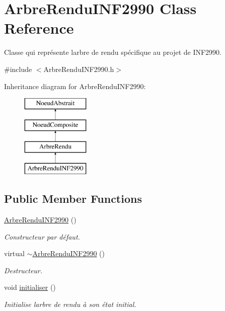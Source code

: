 \hypertarget{class_arbre_rendu_i_n_f2990}{}\section{Arbre\+Rendu\+I\+N\+F2990 Class Reference}
\label{class_arbre_rendu_i_n_f2990}


Classe qui représente l\textquotesingle{}arbre de rendu spécifique au projet de I\+N\+F2990.  




{\ttfamily \#include $<$Arbre\+Rendu\+I\+N\+F2990.\+h$>$}

Inheritance diagram for Arbre\+Rendu\+I\+N\+F2990\+:\begin{figure}[H]
\begin{center}
\leavevmode
\includegraphics[height=4.000000cm]{class_arbre_rendu_i_n_f2990}
\end{center}
\end{figure}
\subsection*{Public Member Functions}
\begin{DoxyCompactItemize}
\item 
\hyperlink{group__inf2990_ga67528b7fa54e8ef8f96ef2e0bad06d2d}{Arbre\+Rendu\+I\+N\+F2990} ()
\begin{DoxyCompactList}\small\item\em Constructeur par défaut. \end{DoxyCompactList}\item 
virtual \hyperlink{group__inf2990_gaa67526b2fd719f6bcef7a4547bd25c7b}{$\sim$\+Arbre\+Rendu\+I\+N\+F2990} ()
\begin{DoxyCompactList}\small\item\em Destructeur. \end{DoxyCompactList}\item 
void \hyperlink{group__inf2990_ga678d89e1f12ae16ee7dcf6de3db637a3}{initialiser} ()
\begin{DoxyCompactList}\small\item\em Initialise l\textquotesingle{}arbre de rendu à son état initial. \end{DoxyCompactList}\end{DoxyCompactItemize}
